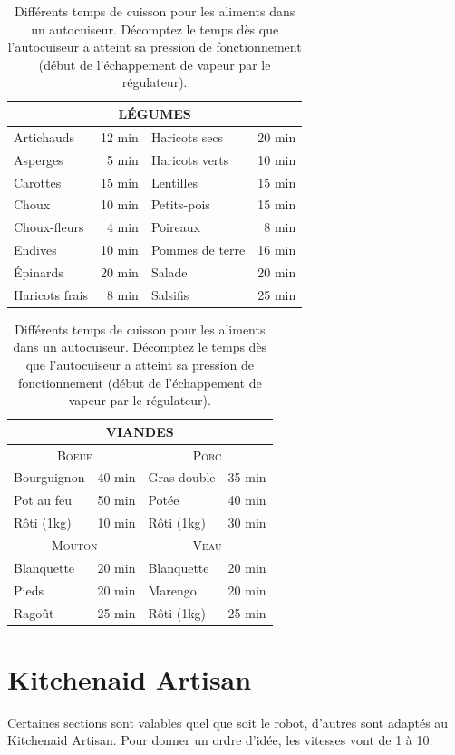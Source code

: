 \documentclass[a4paper,twoside,openright]{report}
\begin{document}
\begin{table}[htb]
\centering
\begin{tabular}{|l|r||l|r|}
\hline
\multicolumn{4}{|c|}{\textbf{LÉGUMES}}\\\hline
Artichauds & 12 min & Haricots secs & 20 min\\\hline
Asperges & 5 min & Haricots verts & 10 min\\\hline
Carottes & 15 min & Lentilles & 15 min\\\hline
Choux & 10 min & Petits-pois & 15 min\\\hline
Choux-fleurs & 4 min & Poireaux & 8 min\\\hline
Endives & 10 min & Pommes de terre & 16 min\\\hline
Épinards & 20 min & Salade & 20 min\\\hline
Haricots frais & 8 min & Salsifis & 25 min\\\hline
\end{tabular}

\bigskip

\begin{tabular}{|l|r||l|r|}
\hline
\multicolumn{4}{|c|}{\textbf{VIANDES}}\\\hline
\multicolumn{2}{|c||}{\textsc{Boeuf}} & \multicolumn{2}{c|}{\textsc{Porc}}\\\hline
Bourguignon & 40 min & Gras double & 35 min\\\hline
Pot au feu & 50 min & Potée & 40 min\\\hline
Rôti (1kg) & 10 min & Rôti (1kg) & 30 min\\\hline
\multicolumn{2}{|c||}{\textsc{Mouton}} & \multicolumn{2}{c|}{\textsc{Veau}}\\\hline
Blanquette & 20 min & Blanquette & 20 min\\\hline
Pieds & 20 min & Marengo & 20 min\\\hline
Ragoût & 25 min & Rôti (1kg) & 25 min\\\hline
\end{tabular}

\caption{Différents temps de cuisson pour les aliments dans un autocuiseur. Décomptez le temps dès que l'autocuiseur a atteint sa pression de fonctionnement (début de l'échappement de vapeur par le régulateur).}\label{tab:cuisson_autocuiseur}
\end{table}

\section{Kitchenaid Artisan}
Certaines sections sont valables quel que soit le robot, d'autres sont adaptés au Kitchenaid Artisan. Pour donner un ordre 
d'idée, les vitesses vont de 1 à 10.
\end{document}
